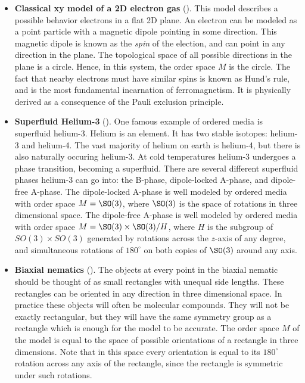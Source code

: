\begin{itemize}
\item {\bf Classical xy model of a 2D electron gas} (\cite{kosterlitz2018ordering}). This model describes a possible behavior electrons in a flat 2D plane. An electron can be modeled as a point particle with a magnetic dipole pointing in some direction. This magnetic dipole is known as the \textit{spin} of the election, and can point in any direction in the plane. The topological space of all possible directions in the plane is a circle. Hence, in this system, the order space $M$ is the circle. The fact that nearby electrons must have similar spins is known as Hund’s rule, and is the most fundamental incarnation of ferromagnetism. It is physically derived as a consequence of the Pauli exclusion principle.

\item \textbf{Superfluid Helium-3} (\cite{lee1997extraordinary}). One famous example of ordered media is superfluid helium-3. Helium is an element. It has two stable isotopes: helium-3 and helium-4. The vast majority of helium on earth is helium-4, but there is also naturally occuring helium-3. At cold temperatures helium-3 undergoes a phase transition, becoming a superfluid. There are several different superfluid phases helium-3 can go into: the B-phase, dipole-locked A-phase, and dipole-free A-phase. The dipole-locked A-phase is well modeled by ordered media with order space $M=\SO(3)$, where $\SO(3)$ is the space of rotations in three dimensional space. The dipole-free A-phase is well modeled by ordered media with order space $M=\SO(3)\times \SO(3)/H$, where $H$ is the subgroup of $SO(3)\times SO(3)$ generated by rotations across the $z$-axis of any degree, and simultaneous rotations of $180^\circ$ on both copies of $\SO(3)$ around any axis.

\item \textbf{Biaxial nematics} (\cite{ranganath1988defects}). The objects at every point in the biaxial nematic should be thought of as small rectangles with unequal side lengths. These rectangles can be oriented in any direction in three dimensional space. In practice these objects will often be molecular compounds. They will not be exactly rectangular, but they will have the same symmetry group as a rectangle which is enough for the model to be accurate. The order space $M$ of the model is equal to the space of possible orientations of a rectangle in three dimensions. Note that in this space every orientation is equal to its $180^\circ$ rotation across any axis of the rectangle, since the rectangle is symmetric under such rotations.
\end{itemize}

